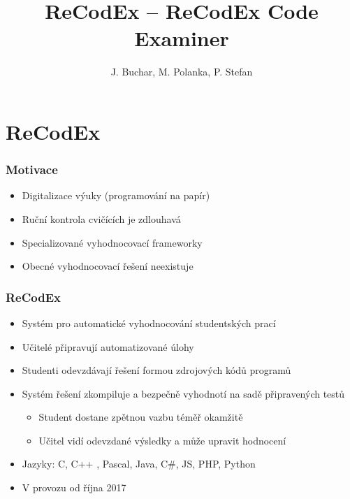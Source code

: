 \documentclass{beamer}
\begin{document}

\title[ReCodEx -- ReCodEx Code Examiner] %
{ReCodEx -- ReCodEx Code Examiner}
\author[Buchar, Polanka, Stefan]{J. Buchar, M. Polanka, P. Stefan}
\date[30. 1. 2018]{} %
\subject{Computer Science}

\frame{\titlepage}

\section{ReCodEx}

\begin{frame}
	\frametitle{Motivace}
	\begin{itemize}
		\item Digitalizace výuky (programování na papír)
		\item Ruční kontrola cvičících je zdlouhavá
		\item Specializované vyhodnocovací frameworky
		\item Obecné vyhodnocovací řešení neexistuje
	\end{itemize}
\end{frame}

\begin{frame}
	\frametitle{ReCodEx}
	\begin{itemize}
		\item Systém pro automatické vyhodnocování studentských prací
		\item Učitelé připravují automatizované úlohy
		\item Studenti odevzdávají řešení formou zdrojových kódů programů
		\item Systém řešení zkompiluje a bezpečně vyhodnotí na sadě připravených testů
		\begin{itemize}
			\item Student dostane zpětnou vazbu téměř okamžitě
			\item Učitel vidí odevzdané výsledky a může upravit hodnocení
		\end{itemize}
		\item Jazyky: C, C++ , Pascal, Java, C\#, JS, PHP, Python
		\item V provozu od října 2017
	\end{itemize}
\end{frame}
\end{document}
